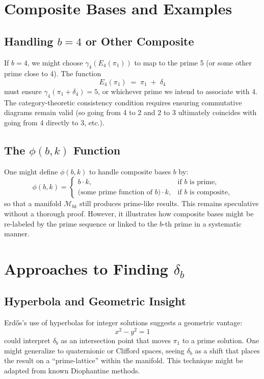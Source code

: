 \documentclass[11pt]{article}
\begin{document}
\section{Composite Bases and Examples}

\subsection{Handling \texorpdfstring{$b=4$}{b=4} or Other Composite}
If $b=4$, we might choose $\gamma_4(E_4(\pi_1))$ to map to the prime 5 
(or some other prime close to 4). The function
\[
  E_4(\pi_1) \;=\; \pi_1 \;+\; \delta_4 
\]
must ensure $\gamma_4(\pi_1 + \delta_4) = 5$, or whichever prime 
we intend to associate with 4. The category-theoretic consistency condition 
requires ensuring commutative diagrams remain valid (so going from 4 to 2 
and 2 to 3 ultimately coincides with going from 4 directly to 3, etc.).

\subsection{The \texorpdfstring{$\phi(b,k)$}{phi(b,k)} Function}
One might define $\phi(b,k)$ to handle composite bases $b$ by:
\[
  \phi(b,k) 
   = \begin{cases}
     b \cdot k, & \text{if $b$ is prime,}\\
     \text{(some prime function of $b$)} \cdot k, & \text{if $b$ is composite,}
   \end{cases}
\]
so that a manifold $\mathcal{M}_{bk}$ still produces prime-like results. 
This remains speculative without a thorough proof. However, 
it illustrates how composite bases might be re-labeled by 
the prime sequence or linked to the $b$-th prime in a systematic manner.

\section{Approaches to Finding \texorpdfstring{$\delta_b$}{db}}

\subsection{Hyperbola and Geometric Insight}
Erd\H{o}s’s use of hyperbolas for integer solutions suggests a geometric vantage:
\[
  x^2 - y^2 = 1
\]
could interpret $\delta_b$ as an intersection point that moves $\pi_1$ 
to a prime solution. One might generalize to quaternionic or Clifford spaces, 
seeing $\delta_b$ as a shift that places the result on a ``prime-lattice'' 
within the manifold. This technique might be adapted from known Diophantine methods.
\end{document}
